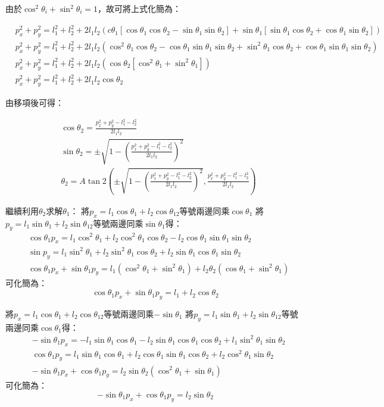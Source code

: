 \documentclass[class=NCU_thesis, crop=false]{standalone}
\begin{document}
由於$\cos^2 \theta_{i}+\sin^2 \theta_{i}=1$，故可將上式化簡為：

$$
\begin{aligned}
& p_{x}^2+p_{y}^2=l_1^2+l_2^2+2l_1 l_2\left(c \theta_1\left[\cos \theta_1 \cos \theta_2-\sin \theta_1 \sin \theta_2\right]+\sin \theta_1\left[\sin \theta_1 \cos \theta_2+\cos \theta_1 \sin \theta_2\right]\right) \\
& p_{x}^2+p_y^2=l_1^2+l_2^2+2l_1 l_2\left(\cos^2 \theta_1 \cos \theta_2-\cos \theta_1 \sin \theta_1 \sin \theta_2+\sin^2 \theta_1 \cos \theta_2+\cos \theta_1 \sin \theta_1 \sin \theta_2\right) \\
& p_{x}^2+p_y^2=l_1^2+l_2^2+2l_1 l_2\left(\cos \theta_2\left[\cos^2 \theta_1+\sin^2 \theta_1\right]\right) \\
& p_{x}^2+p_{y}^2=l_1^2+l_2^2+2l_1 l_2 \cos \theta_2
\end{aligned}
$$

由移項後可得：

$$
\begin{aligned}
& \cos \theta_2=\frac{p_{x}^2+p_{y}^2-l_1^2-l_2^2}{2l_1 l_2} \\
& \sin \theta_2= \pm \sqrt{1-\left(\frac{p_{x}^2+p_{y}^2-l_1^2-l_2^2}{2l_1 l_2}\right)^2} \\
& \theta_2=A \tan 2\left( \pm \sqrt{1-\left(\frac{p_{x}^2+p_{y}^2-l_1^2-l_2^2}{2l_1 l_2}\right)^2}, \frac{p_{x}^2+p_{y}^2-l_1^2-l_2^2}{2l_1 l_2}\right)
\end{aligned}
$$

繼續利用$\theta_2$求解$\theta_1$：
將$p_{x}=l_1 \cos \theta_1+l_2 \cos \theta_{12}$等號兩邊同乘$\cos \theta_1$
將$p_{y}=l_1 \sin \theta_1+l_2 \sin \theta_{12}$等號兩邊同乘$\sin \theta_1$得：
$$
\begin{aligned}
& \cos \theta_1 p_{x}=l_1 \cos^2 \theta_1+l_2 \cos^2 \theta_1 \cos \theta_2-l_2 \cos \theta_1 \sin \theta_1 \sin \theta_2 \\
& \sin p_{y}=l_1 \sin^2 \theta_1+l_2 \sin^2 \theta_{1} \cos \theta_2+l_2 \sin \theta_1 \cos \theta_1 \sin \theta_2 \\
& \cos \theta_1 p_{x}+\sin \theta_1 p_{y}=l_1\left(\cos^2 \theta_1+\sin^2 \theta_1\right)+l_2 \theta_2\left(\cos \theta_1+\sin^2 \theta_1\right)
\end{aligned}
$$
可化簡為：
$$
\cos \theta_1 p_{x}+\sin \theta_1 p_{y}=l_1+l_2 \cos \theta_2
$$

將$p_{x}=l_1 \cos \theta_1+l_2 \cos \theta_{12}$等號兩邊同乘$-\sin \theta_1$
將$p_{y}=l_1 \sin \theta_1+l_2 \sin \theta_{12}$等號兩邊同乘$\cos \theta_1$得：
$$
\begin{aligned}
& -\sin \theta_1 p_{x}=-l_1 \sin \theta_1 \cos \theta_1-l_2 \sin \theta_1 \cos \theta_1 \cos \theta_2+l_1 \sin^2 \theta_1 \sin \theta_2 \\
& \cos \theta_1 p_{y}=l_1 \sin \theta_1 \cos \theta_1+l_2 \cos \theta_1 \sin \theta_1 \cos \theta_2+l_2 \cos^2 \theta_1 \sin \theta_2 \\
& -\sin \theta_1 p_{x}+\cos \theta_1 p_{y}=l_2 \sin \theta_2\left(\cos^2 \theta_1+\sin \theta_1\right)
\end{aligned}
$$
可化簡為：
$$
-\sin \theta_1 p_{x} + \cos \theta_1 p_{y} = l_2 \sin \theta_2
$$
\end{document}
